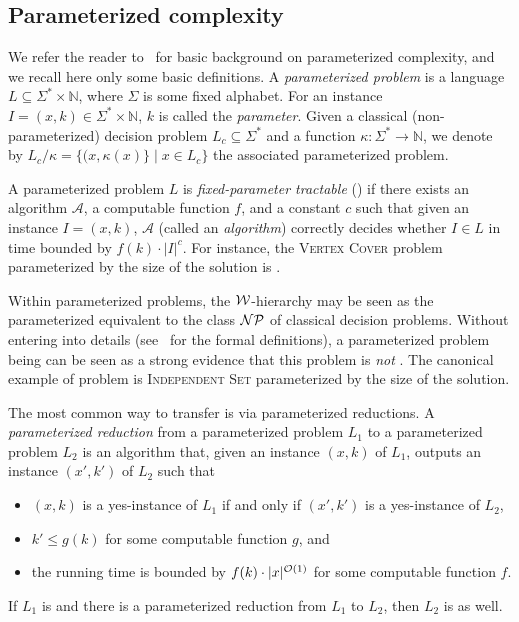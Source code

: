 \documentclass[12pt]{article}
\begin{document}
\begin{appendix}
\subsection{Parameterized complexity}
\label{app:fpt}

We refer the reader to~\cite{DF13,CyganFKLMPPS15} for basic background on parameterized complexity, and we recall here only some basic definitions. A \emph{parameterized problem} is a language $L \subseteq \Sigma^* \times \mathbb{N}$, where $\Sigma$ is some fixed alphabet.  For an instance $I=(x,k) \in \Sigma^* \times \mathbb{N}$, $k$ is called the \emph{parameter}.
Given a classical (non-parameterized) decision problem $L_{c} \subseteq \Sigma^*$ and a function $\kappa: \Sigma^* \rightarrow \mathbb{N}$, we denote by
$L_{c}/\kappa = \{(x,\kappa(x)\} \mid x \in L_{c}\}$ the associated parameterized problem.

A parameterized problem $L$ is \emph{fixed-parameter tractable} (\FPT) if there exists an algorithm $\mathcal{A}$, a computable function $f$, and a constant $c$ such that given an instance $I=(x,k)$, $\mathcal{A}$   (called an \FPT \emph{algorithm}) correctly decides whether $I \in L$ in time bounded by $f(k) \cdot |I|^c$.
For instance, the \textsc{Vertex Cover} problem parameterized by the size of the solution is \FPT.

Within parameterized problems, the $\cal{W}$-hierarchy may be seen as the parameterized equivalent to the class $\mathcal{NP}$ of classical decision problems. Without entering into details (see~\cite{DF13,CyganFKLMPPS15} for the formal definitions), a parameterized problem being \WONEH can be seen as a strong evidence that this problem is \textsl{not} \FPT.
The canonical example of \WONEH problem is \textsc{Independent Set}  parameterized by the size of the solution.


The most common way to transfer \WONEHness is via parameterized reductions.
A \emph{parameterized reduction} from a parameterized problem $L_1$ to a parameterized problem $L_2$ is an algorithm that, given an instance $(x,k)$ of $L_1$, outputs an instance $(x',k')$ of $L_2$
such that
\begin{itemize}
\item $(x,k)$ is a yes-instance of $L_1$ if and only if $(x',k')$ is a yes-instance of $L_2$,
\item $k' \le g(k)$ for some computable function $g$, and
\item the running time is bounded by $f(k)\cdot|x|^{\mathcal{O}(1)}$ for some computable function $f$.
\end{itemize}
If $L_1$ is \WONEH and there is a parameterized reduction from $L_1$ to $L_2$, then $L_2$ is \WONEH as well.



\end{appendix}
\end{document}
